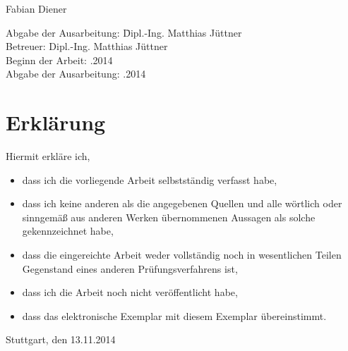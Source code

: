 \documentclass[a4paper,12pt,oneside,openright,onecolumn,final,titlepage,fleqn,ngerman]{scrreprt}
\begin{document}
\begin{titlepage}
\begin{center}
			{\Large Fabian Diener}
	
			\vspace{23ex}
	
			\begin{tabbing}
				Abgabe der Ausarbeitung: \quad \= Dipl.-Ing. Matthias Jüttner\kill\\
				Betreuer: \> Dipl.-Ing. Matthias Jüttner\\[0.5ex]
				Beginn der Arbeit: .2014\\[0.5ex]
				Abgabe der Ausarbeitung: .2014
			\end{tabbing}
		\end{center}
	\end{titlepage}

	\restoregeometry

	\thispagestyle{empty}
	\cleardoublepage

	\chapter*{Erklärung}
	Hiermit erkläre ich,

	\begin{itemize}
		\item dass ich die vorliegende Arbeit selbstständig verfasst habe,
		\item dass ich keine anderen als die angegebenen Quellen und alle wörtlich oder sinngemäß aus anderen Werken übernommenen Aussagen als solche gekennzeichnet habe,
		\item dass die eingereichte Arbeit weder vollständig noch in wesentlichen Teilen Gegenstand eines anderen Prüfungsverfahrens ist,
		\item dass ich die Arbeit noch nicht veröffentlicht habe,
		\item dass das elektronische Exemplar mit diesem Exemplar übereinstimmt.
	\end{itemize}

	\bigskip

	Stuttgart, den 13.11.2014

	\newpage
	
\end{document}
